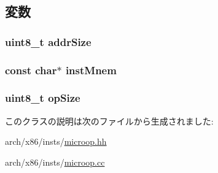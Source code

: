\subsection{変数}
\hypertarget{classX86ISA_1_1X86MicroopBase_aaff1bd964b905dbe543c06ee011c7462}{
\subsubsection[{addrSize}]{\setlength{\rightskip}{0pt plus 5cm}uint8\_\-t {\bf addrSize}}}
\label{classX86ISA_1_1X86MicroopBase_aaff1bd964b905dbe543c06ee011c7462}
\hypertarget{classX86ISA_1_1X86MicroopBase_a51ebef7342f07ab51f31ef4ae7e04ee0}{
\subsubsection[{instMnem}]{\setlength{\rightskip}{0pt plus 5cm}const char$\ast$ {\bf instMnem}}}
\label{classX86ISA_1_1X86MicroopBase_a51ebef7342f07ab51f31ef4ae7e04ee0}
\hypertarget{classX86ISA_1_1X86MicroopBase_ad3cabad3e6f648d2da97051c2b37229b}{
\subsubsection[{opSize}]{\setlength{\rightskip}{0pt plus 5cm}uint8\_\-t {\bf opSize}}}
\label{classX86ISA_1_1X86MicroopBase_ad3cabad3e6f648d2da97051c2b37229b}


このクラスの説明は次のファイルから生成されました:\begin{DoxyCompactItemize}
\item 
arch/x86/insts/\hyperlink{microop_8hh}{microop.hh}\item 
arch/x86/insts/\hyperlink{microop_8cc}{microop.cc}\end{DoxyCompactItemize}
